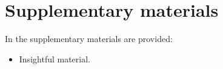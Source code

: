 \documentclass[aip,reprint]{revtex4-1}
\begin{document}
\section{Supplementary materials}
In the supplementary materials are provided:
\begin{itemize}
\item Insightful material.
\end{itemize}


\end{document}
